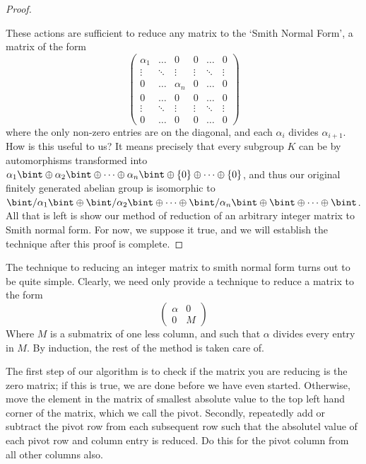 \begin{proof}
\begin{itemize}
    \end{itemize}
    These actions are sufficient to reduce any matrix to the `Smith Normal Form', a matrix of the form
    \[ \begin{pmatrix}
            \alpha_1 & \dots  & 0        & 0      & \dots  & 0\\
            \vdots   & \ddots & \vdots   & \vdots & \ddots & \vdots\\
            0        & \dots  & \alpha_n & 0      & \dots  & 0\\
            0        & \dots  & 0        & 0      & \dots  & 0\\
            \vdots   & \ddots & \vdots   & \vdots & \ddots & \vdots\\
            0        & \dots  & 0        & 0      & \dots  & 0
       \end{pmatrix} \]
    where the only non-zero entries are on the diagonal, and each $\alpha_i$ divides $\alpha_{i+1}$. How is this useful to us? It means precisely that every subgroup $K$ can be by automorphisms transformed into $\alpha_1\bint \oplus \alpha_2\bint \oplus \dots \oplus \alpha_n\bint \oplus \{0\} \oplus \dots \oplus \{0\}$, and thus our original finitely generated abelian group is isomorphic to $\bint/\alpha_1\bint \oplus \bint/\alpha_2\bint \oplus \dots \oplus \bint/\alpha_n\bint \oplus \bint \oplus \dots \oplus \bint$. All that is left is show our method of reduction of an arbitrary integer matrix to Smith normal form. For now, we suppose it true, and we will establish the technique after this proof is complete.
\end{proof}

The technique to reducing an integer matrix to smith normal form turns out to be quite simple. Clearly, we need only provide a technique to reduce a matrix to the form
%
\[ \begin{pmatrix} \alpha & 0\\0 & M \end{pmatrix} \]
%
Where $M$ is a submatrix of one less column, and such that $\alpha$ divides every entry in $M$. By induction, the rest of the method is taken care of.

The first step of our algorithm is to check if the matrix you are reducing is the zero matrix; if this is true, we are done before we have even started. Otherwise, move the element in the matrix of smallest absolute value to the top left hand corner of the matrix, which we call the pivot. Secondly, repeatedly add or subtract the pivot row from each subsequent row such that the absolutel value of each pivot row and column entry is reduced. Do this for the pivot column from all other columns also.


